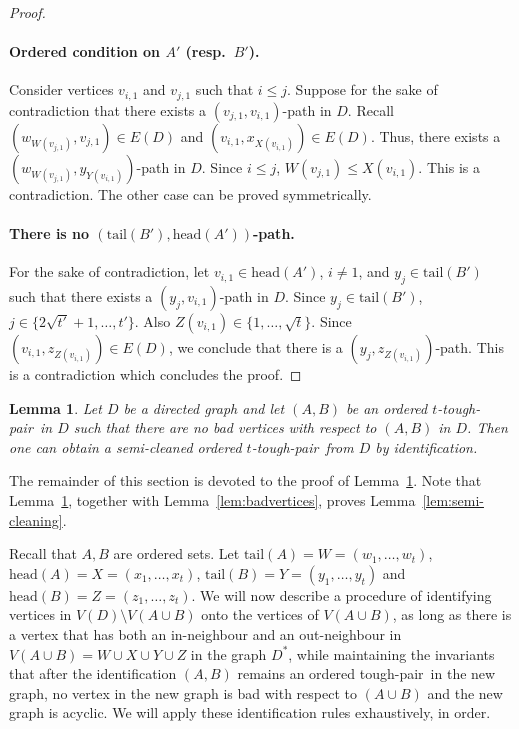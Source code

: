 \documentclass[a4paper,11pt]{article}
\theoremstyle{plain}
\newtheorem{lemma}[theorem]{Lemma}
\newtheorem{identification rule}{Identification Rule}
\theoremstyle{definition}
\theoremstyle{remark}
\newcommand{\toughpair}{tough-pair}
\newcommand{\head}{\text{head}}
\newcommand{\tail}{\text{tail}}
\begin{document}
\begin{proof}
\paragraph*{Ordered condition on $A'$ (resp.~$B'$).}
Consider vertices $v_{i,1}$ and $v_{j,1}$ such that $i \leq j$. Suppose for the sake of contradiction that there exists a $(v_{j,1},v_{i,1})$-path in $D$. Recall $(w_{W(v_{j,1})}, v_{j,1}) \in E(D)$ and $(v_{i,1},x_{X(v_{i,1})}) \in E(D)$. Thus, there exists a $(w_{W(v_{j,1})}, y_{Y(v_{i,1})})$-path in $D$. Since $i \leq j$, $W(v_{j,1}) \leq X(v_{i,1})$. This is a contradiction. The other case can be proved symmetrically.

\paragraph*{There is no $(\tail(B'),\head(A'))$-path.} For the sake of contradiction, let $v_{i,1} \in \head(A')$, $i\neq 1$, and $y_j \in \tail(B')$ such that there exists a $(y_j, v_{i,1})$-path in $D$. Since $y_j \in \tail(B')$, $j \in \{2\sqrt{t'} +1, \ldots, t'\}$. Also $Z(v_{i,1}) \in \{1, \ldots, \sqrt{t}\}$. Since $(v_{i,1}, z_{Z(v_{i,1})}) \in E(D)$, we conclude that there is a $(y_j, z_{Z(v_{i,1})})$-path. This is a contradiction which concludes the proof.
\end{proof}

\begin{lemma}\label{lem:semin-cleaning-wo-bad}
Let $D$ be a directed 
graph and let $(A,B)$ be an ordered $t$-\toughpair\ in $D$ such that there are no bad vertices with respect to $(A,B)$ in $D$. Then one can obtain a semi-cleaned ordered $t$-\toughpair\ from $D$ by identification.
\end{lemma}

The remainder of this section is devoted to the proof of Lemma~\ref{lem:semin-cleaning-wo-bad}. Note that Lemma~\ref{lem:semin-cleaning-wo-bad}, together with Lemma~\ref{lem:badvertices}, proves Lemma~\ref{lem:semi-cleaning}.

Recall that $A,B$ are ordered sets. Let $\tail(A)=W=(w_1, \ldots,w_t)$, $\head(A)=X=(x_1, \ldots,x_t)$, $\tail(B)=Y=(y_1, \ldots, y_t)$ and $\head(B)=Z=(z_1, \ldots, z_t)$.
We will now describe a procedure of identifying vertices in $V(D) \setminus V(A \cup B)$ onto the vertices of $V(A \cup B)$, as long as there is a vertex that has both an in-neighbour and an out-neighbour in $V(A \cup B) = W \cup X \cup Y \cup Z$ in the graph $D^*$, while maintaining the invariants
that after the identification $(A,B)$ remains an ordered \toughpair\ 
in the new graph, no vertex in the new graph is bad with respect to $(A \cup B)$ and the new graph is acyclic. We will apply these identification rules exhaustively, in order.
\end{document}
